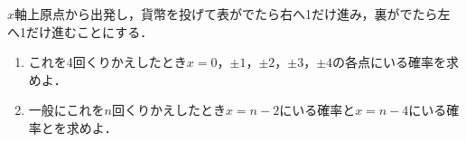 \documentclass[../../main.tex]{subfiles}
\begin{document}
$x$軸上原点から出発し，貨幣を投げて表がでたら右へ1だけ進み，裏がでたら左へ1だけ進むことにする．
\begin{enumerate}
  \item これを4回くりかえしたとき$x=0$，$\pm1$，$\pm2$，$\pm3$，$\pm4$の各点にいる確率を求めよ．
  \item 一般にこれを$n$回くりかえしたとき$x=n-2$にいる確率と$x=n-4$にいる確率とを求めよ．
\end{enumerate}
\end{document}
